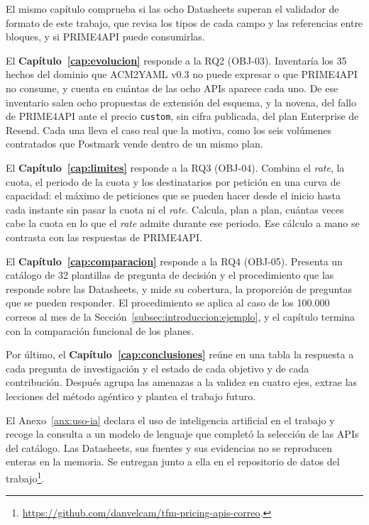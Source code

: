El mismo capítulo comprueba si las ocho Datasheets superan el validador de
formato de este trabajo, que revisa los tipos de cada campo y las referencias
entre bloques, y si PRIME4API puede consumirlas.

El \textbf{Capítulo~\ref{cap:evolucion}} responde a la RQ2 (OBJ-03). Inventaría
los 35 hechos del dominio que ACM2YAML v0.3 no puede expresar o que
PRIME4API no consume, y cuenta en cuántas de las ocho APIs aparece cada uno. De
ese inventario salen ocho propuestas de extensión del esquema, y la novena, del
fallo de PRIME4API ante el precio \texttt{custom}, sin cifra publicada, del
plan Enterprise de Resend.
Cada una lleva el caso real que la motiva, como los seis volúmenes contratados que Postmark vende
dentro de un mismo plan.

El \textbf{Capítulo~\ref{cap:limites}} responde a la RQ3 (OBJ-04). Combina el
\textit{rate}, la cuota, el periodo de la cuota y los destinatarios por
petición en una curva de capacidad: el máximo de peticiones que se pueden
hacer desde el inicio hasta cada instante sin pasar la cuota ni el
\textit{rate}. Calcula, plan a plan, cuántas veces cabe la cuota en lo que el
\textit{rate} admite durante ese periodo. Ese cálculo a mano se contrasta con
las respuestas de PRIME4API.

El \textbf{Capítulo~\ref{cap:comparacion}} responde a la RQ4 (OBJ-05). Presenta
un catálogo de 32 plantillas de pregunta de decisión y el procedimiento que las
responde sobre las Datasheets, y mide su cobertura, la proporción de preguntas
que se pueden responder. El procedimiento se aplica
al caso de los 100.000 correos al mes de la
Sección~\ref{subsec:introduccion:ejemplo}, y el capítulo termina con la
comparación funcional de los planes.

Por último, el \textbf{Capítulo~\ref{cap:conclusiones}} reúne en una tabla la
respuesta a cada pregunta de investigación y el estado de cada objetivo y de
cada contribución. Después agrupa las amenazas a la validez en cuatro ejes,
extrae las lecciones del método agéntico y plantea el trabajo futuro.

El Anexo~\ref{anx:uso-ia} declara el uso de inteligencia artificial en el trabajo
y recoge la consulta a un modelo de lenguaje que completó la selección de
las APIs del catálogo. Las
Datasheets, sus fuentes y sus evidencias no se reproducen enteras en la memoria. Se
entregan junto a ella en el repositorio de datos del
trabajo\footnote{\url{https://github.com/danvelcam/tfm-pricing-apis-correo}.}.
